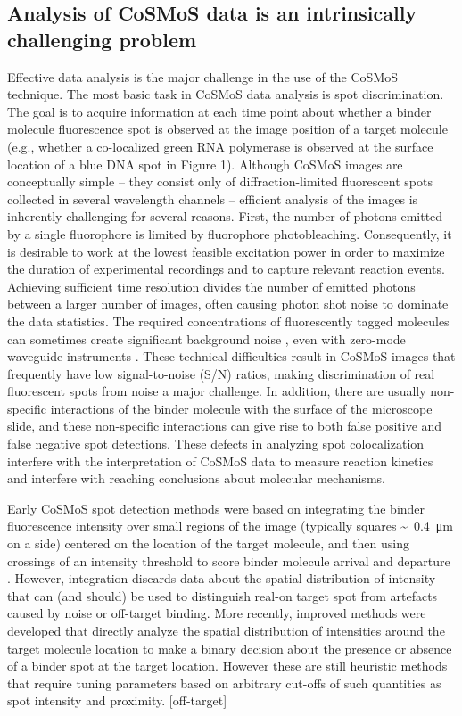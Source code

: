 \subsection{Analysis of CoSMoS data is an intrinsically challenging problem}
Effective data analysis is the major challenge in the use of the CoSMoS technique. The most basic task in CoSMoS data analysis is spot discrimination. The goal is to acquire information at each time point about whether a binder molecule fluorescence spot is observed at the image position of a target molecule (e.g., whether a co-localized green RNA polymerase is observed at the surface location of a blue DNA spot in Figure 1). Although CoSMoS images are conceptually simple -- they consist only of diffraction-limited fluorescent spots collected in several wavelength channels -- efficient analysis of the images is inherently challenging for several reasons. First, the number of photons emitted by a single fluorophore is limited by fluorophore photobleaching. Consequently, it is desirable to work at the lowest feasible excitation power in order to maximize the duration of experimental recordings and to capture relevant reaction events. Achieving sufficient time resolution divides the number of emitted photons between a larger number of images, often causing photon shot noise to dominate the data statistics. The required concentrations of fluorescently tagged molecules can sometimes create significant background noise \cite{Peng2018-ge, Van_Oijen2011-ig}, even with zero-mode waveguide instruments \cite{Chen2014-jd}. These technical difficulties result in CoSMoS images that frequently have low signal-to-noise (S/N) ratios, making discrimination of real fluorescent spots from noise a major challenge. In addition, there are usually non-specific interactions of the binder molecule with the surface of the microscope slide, and these non-specific interactions can give rise to both false positive and false negative spot detections. These defects in analyzing spot colocalization interfere with the interpretation of CoSMoS data to measure reaction kinetics and interfere with reaching conclusions about molecular mechanisms.

Early CoSMoS spot detection methods were based on integrating the binder fluorescence intensity over small regions of the image (typically squares \SI{0.4}[\sim]{\um} on a side) centered on the location of the target molecule, and then using crossings of an intensity threshold to score binder molecule arrival and departure \cite{Friedman2015-nx}. However, integration discards data about the spatial distribution of intensity that can (and should) be used to distinguish real-on target spot from artefacts caused by noise or off-target binding.  More recently, improved methods \cite{Friedman2015-nx,Smith2019-yb} were developed that directly analyze the spatial distribution of intensities around the target molecule location to make a binary decision about the presence or absence of a binder spot at the target location.  However these are still heuristic methods that require tuning parameters based on arbitrary cut-offs of such quantities as spot intensity and proximity.  [off-target]

